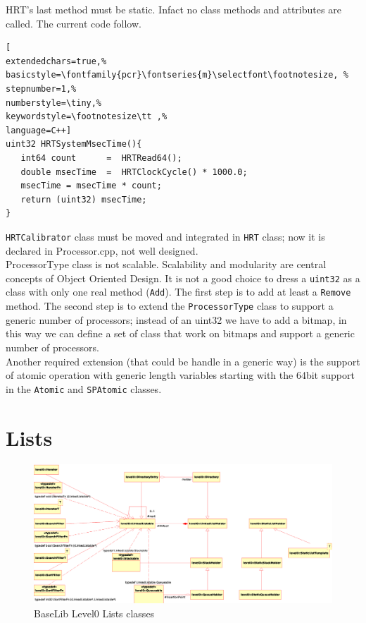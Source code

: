 HRT's last method must be static. Infact no class methods and attributes are called. The current code follow.

\begin{lstlisting}[
extendedchars=true,%
basicstyle=\fontfamily{pcr}\fontseries{m}\selectfont\footnotesize, %
stepnumber=1,%
numberstyle=\tiny,%
keywordstyle=\footnotesize\tt ,%
language=C++]
uint32 HRTSystemMsecTime(){
   int64 count      =  HRTRead64();
   double msecTime  =  HRTClockCycle() * 1000.0;
   msecTime = msecTime * count;
   return (uint32) msecTime;
}
\end{lstlisting}

\texttt{HRTCalibrator} class must be moved and integrated in \texttt{HRT} class; now it is declared in Processor.cpp, not well designed. \\


ProcessorType class is not scalable. Scalability and modularity are central concepts of Object Oriented Design. It is not a good choice to dress a \texttt{uint32} as a class with only one real method (\texttt{Add}). The first step is to add at least a \texttt{Remove} method. The second step is to extend the \texttt{ProcessorType} class to support a generic number of processors; instead of an uint32 we have to add a bitmap, in this way we can define a set of class that work on bitmaps and support a generic number of processors.\\


Another required extension (that could be handle in a generic way) is the support of atomic operation with generic length variables starting with the 64bit support in the \texttt{Atomic} and \texttt{SPAtomic} classes. \\






\section{Lists}
\begin{figure}[h!]
 \begin{center}
  \includegraphics[width=\textwidth]{level0/level0-lists.eps}
  \caption{BaseLib Level0 Lists classes}
  \label{f:level0:lists}
 \end{center}
\end{figure}

